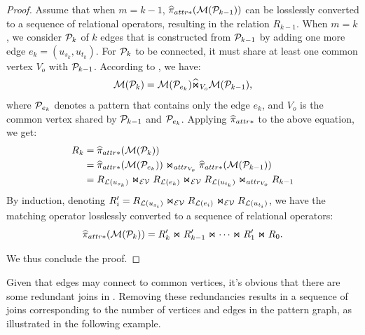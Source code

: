 \begin{proof}
Assume that when $m = k-1$, $\widehat{\pi}_{attr*}(\mathcal{M}(\mathcal{P}_{k-1}))$ can be losslessly converted to a sequence of relational operators, resulting in the relation $R_{k-1}$. When $m = k$, we consider $\mathcal{P}_{k}$ of $k$ edges that is constructed from $\mathcal{P}_{k-1}$ by adding one more edge $e_k = (u_{s_k}, u_{t_k})$. For $\mathcal{P}_{k}$ to be connected, it must share at least one common vertex $V_o$ with $\mathcal{P}_{k-1}$. According to , we have:
\[ \mathcal{M}(\mathcal{P}_{k}) =  \mathcal{M}(\mathcal{P}_{e_k}) \widehat{\Join}_{V_o} \mathcal{M}(\mathcal{P}_{k-1}), \]
where $\mathcal{P}_{e_k}$ denotes a pattern that contains only the edge $e_k$, and $V_o$ is the common vertex shared by $\mathcal{P}_{k-1}$ and $\mathcal{P}_{e_k}$. Applying $\widehat{\pi}_{attr*}$ to the above equation, we get:
\begin{equation*}
\begin{split}
R_k &= \widehat{\pi}_{attr*}(\mathcal{M}(\mathcal{P}_{k})) \\
    &= \widehat{\pi}_{attr*}(\mathcal{M}(\mathcal{P}_{e_k})) \Join_{attr_{V_o}}  \widehat{\pi}_{attr*}(\mathcal{M}(\mathcal{P}_{k-1})) \\
    &= {R_{\mathcal{L}(u_{s_k})}} \Join_\mathcal{EV} {R_{\mathcal{L}(e_k)}} \Join_\mathcal{EV} {R_{\mathcal{L}(u_{t_k})}} \Join_{attr_{V_o}} R_{k-1}
\end{split}
\end{equation*}
By induction, denoting $R'_i = {R_{\mathcal{L}(u_{s_i})}} \Join_\mathcal{EV} {R_{\mathcal{L}(e_i)}} \Join_\mathcal{EV} {R_{\mathcal{L}(u_{t_i})}}$, we have the matching operator losslessly converted to a sequence of relational operators:
\begin{equation}
    \label{eq:graph-agnostic}
    \widehat{\pi}_{attr*}(\mathcal{M}(\mathcal{P}_{k})) = R'_k \Join R'_{k-1} \Join \cdots \Join R'_1 \Join R_0.
\end{equation}

We thus conclude the proof.
\end{proof}


Given that edges may connect to common vertices, it's obvious that there are some redundant joins in . Removing these redundancies results in a sequence of joins corresponding to the number of vertices and edges in the pattern graph, as illustrated in the following example.

